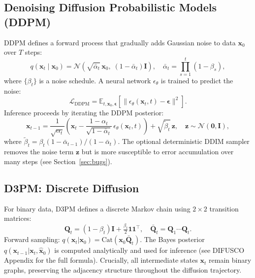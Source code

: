 \documentclass[11pt,a4paper]{article}
\begin{document}
\subsection{Denoising Diffusion Probabilistic Models (DDPM)}
DDPM \citep{ho2020ddpm} defines a forward process that gradually adds Gaussian noise to data
$\mathbf{x}_0$ over $T$ steps:
\begin{equation}
  q(\mathbf{x}_t \mid \mathbf{x}_0)
  = \mathcal{N}\!\left(\sqrt{\bar\alpha_t}\,\mathbf{x}_0,\;(1-\bar\alpha_t)\mathbf{I}\right),
  \quad \bar\alpha_t = \prod_{s=1}^t (1-\beta_s),
  \label{eq:ddpm_forward}
\end{equation}
where $\{\beta_t\}$ is a noise schedule. A neural network $\epsilon_\theta$ is trained to
predict the noise:
\begin{equation}
  \mathcal{L}_\text{DDPM}
  = \mathbb{E}_{t,\mathbf{x}_0,\boldsymbol\epsilon}
    \left[\|\epsilon_\theta(\mathbf{x}_t, t) - \boldsymbol\epsilon\|^2\right].
  \label{eq:ddpm_loss}
\end{equation}
Inference proceeds by iterating the DDPM posterior:
\begin{equation}
  \mathbf{x}_{t-1}
  = \frac{1}{\sqrt{\alpha_t}}\!\left(\mathbf{x}_t - \frac{1-\alpha_t}{\sqrt{1-\bar\alpha_t}}\,
    \epsilon_\theta(\mathbf{x}_t,t)\right) + \sqrt{\tilde\beta_t}\,\mathbf{z},
  \quad \mathbf{z}\sim\mathcal{N}(\mathbf{0},\mathbf{I}),
  \label{eq:ddpm_posterior}
\end{equation}
where $\tilde\beta_t = \beta_t(1-\bar\alpha_{t-1})/(1-\bar\alpha_t)$.
The optional deterministic DDIM sampler \citep{song2020ddim} removes the noise term $\mathbf{z}$
but is more susceptible to error accumulation over many steps (see Section~\ref{sec:bugs}).

\subsection{D3PM: Discrete Diffusion}
\label{sec:d3pm}
For binary data, D3PM \citep{austin2021d3pm} defines a discrete Markov chain using
$2\times 2$ transition matrices:
\begin{equation}
  \mathbf{Q}_t = (1-\beta_t)\mathbf{I} + \tfrac{\beta_t}{2}\mathbf{1}\mathbf{1}^\top,
  \quad \bar{\mathbf{Q}}_t = \mathbf{Q}_1\cdots\mathbf{Q}_t.
\end{equation}
Forward sampling: $q(\mathbf{x}_t|\mathbf{x}_0)
= \text{Cat}(\mathbf{x}_0\bar{\mathbf{Q}}_t)$.
The Bayes posterior $q(\mathbf{x}_{t-1}|\mathbf{x}_t,\hat{\mathbf{x}}_0)$ is computed
analytically and used for inference (see DIFUSCO \citep{sun2023difusco} Appendix for
the full formula). Crucially, all intermediate states $\mathbf{x}_t$ remain binary
graphs, preserving the adjacency structure throughout the diffusion trajectory.
\end{document}
